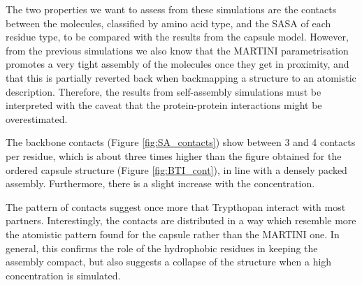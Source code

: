The two properties we want to assess from these simulations are the contacts between the molecules, classified by amino acid type, and the SASA of each residue type, to be compared with the results from the capsule model. However, from the previous simulations we also know that the MARTINI parametrisation promotes a very tight assembly of the molecules once they get in proximity, and that this is partially reverted back when backmapping a structure to an atomistic description. Therefore, the results from self-assembly simulations must be interpreted with the caveat that the protein-protein interactions might be overestimated.

The backbone contacts (Figure \ref{fig:SA_contacts}) show between 3 and 4 contacts per residue, which is about three times higher than the figure obtained for the ordered capsule structure (Figure \ref{fig:BTI_cont}), in line with a densely packed assembly.
%
Furthermore, there is a slight increase with the concentration.

The pattern of contacts suggest once more that Trypthopan interact with most partners. Interestingly, the contacts are distributed in a way which resemble more the atomistic pattern found for the capsule rather than the MARTINI one. In general, this confirms the role of the hydrophobic residues in keeping the assembly compact, but also suggests a collapse of the structure when a high concentration is simulated.

